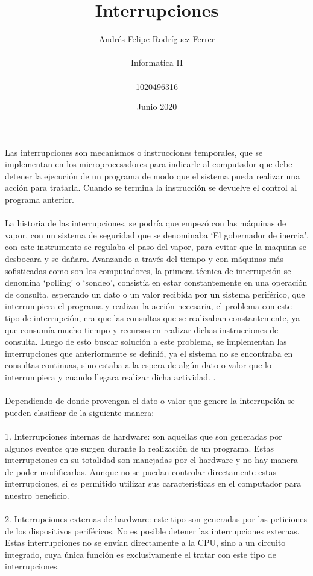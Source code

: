 \documentclass{article}
\title{Interrupciones}
\author{Andrés Felipe Rodríguez Ferrer\\\\Informatica II\\\\1020496316\\}
\date{Junio 2020}
\begin{document}
\maketitle
Las interrupciones son mecanismos o instrucciones temporales, que se implementan en los microprocesadores para indicarle al computador que debe detener la ejecución de un programa de modo que el sistema pueda realizar una acción para tratarla. Cuando se termina la instrucción se devuelve el control al programa anterior.\citep{1}\\\\
La historia de las interrupciones, se podría que empezó con las máquinas de vapor, con un sistema de seguridad que se denominaba ‘El gobernador de inercia’, con este instrumento se regulaba el paso del vapor, para evitar que la maquina se desbocara y se dañara\citep{2}. Avanzando a través del tiempo y con máquinas más sofisticadas como son los computadores, la primera técnica de interrupción se denomina ‘polling’ o ‘sondeo’, consistía en estar constantemente en una operación de consulta, esperando un dato o un valor recibida por un sistema periférico, que interrumpiera el programa y realizar la acción necesaria, el problema con este tipo de interrupción, era que las consultas que se realizaban constantemente, ya que consumía mucho tiempo y recursos en realizar dichas instrucciones de consulta. Luego de esto buscar solución a este problema, se implementan las interrupciones que anteriormente se definió, ya el sistema no se encontraba en consultas continuas, sino estaba a la espera de algún dato o valor que lo interrumpiera y cuando llegara realizar dicha actividad\citep{3}. .\\\\Dependiendo de donde provengan el dato o valor que genere la interrupción se pueden clasificar de la siguiente manera:\\\\ 
1. Interrupciones internas de hardware: son aquellas que son generadas por algunos eventos que surgen durante la realización de un programa. Estas interrupciones en su totalidad son manejadas por el hardware y no hay manera de poder modificarlas. Aunque no se puedan controlar directamente estas interrupciones, si es permitido utilizar sus características en el computador para nuestro beneficio.\citep{4}\\\\
2.	Interrupciones externas de hardware: este tipo son generadas por las peticiones de los dispositivos periféricos. No es posible detener las interrupciones externas. Estas interrupciones no se envían directamente a la CPU, sino a un circuito integrado, cuya única función es exclusivamente el tratar con este tipo de interrupciones.\citep{4}\\\\
\end{document}
